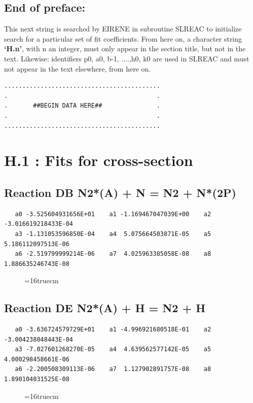 \documentclass[12pt]{article}
\begin{document}
\subsection*{End of preface:}
This next string is searched by EIRENE in subroutine SLREAC
to initialize search for a particular set of fit coefficients.
From here on, a character string \textbf{`H.n'}, with n an integer, must only appear in the
section title,
but not in the text. Likewise: identifiers p0, a0, b-1, ....,h0, k0 are used
in SLREAC and must not
appear in the text elsewhere, from here on.

\bigskip
\begin{small}\begin{verbatim}
...........................................
.                                         .
.       ##BEGIN DATA HERE##               .
.                                         .
...........................................
\end{verbatim}\end{small}
\newpage

\setcounter{section}{0}

\section{H.1 : Fits for cross-section }

\subsection{
Reaction DB N2*(A) + N  = N2 + N*(2P)}
\begin{small}\begin{verbatim}
   a0 -3.525604931656E+01    a1 -1.169467047039E+00    a2 -3.016619218433E-04
   a3 -1.131053596850E-04    a4  5.075664503871E-05    a5  5.186112097513E-06
   a6 -2.519799999214E-06    a7  4.025963385058E-08    a8  1.886635246743E-08
   \end{verbatim}\end{small}
\begin{figure}[h!] \label{n2rates}
\epsfxsize=16truecm
\end{figure}
\newpage

\subsection{
Reaction DE N2*(A) + H = N2 + H}
\begin{small}\begin{verbatim}
   a0 -3.636724579729E+01    a1 -4.996921680518E-01    a2 -3.004238048443E-04
   a3 -7.027601268270E-05    a4  4.639562577142E-05    a5  4.000298458661E-06
   a6 -2.200508309113E-06    a7  1.127902891757E-08    a8  1.890104031525E-08
   \end{verbatim}\end{small}
\begin{figure}[h!] \label{n2rates}
\epsfxsize=16truecm
\end{figure}
\newpage
\end{document}
